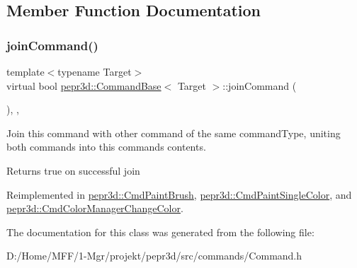 \subsection{Member Function Documentation}
\mbox{\label{classpepr3d_1_1_command_base_a9ef408154b7cb446e626e049f268abb4}} 
\subsubsection{\texorpdfstring{joinCommand()}{joinCommand()}}
{\footnotesize\ttfamily template$<$typename Target$>$ \\
virtual bool \mbox{\hyperlink{classpepr3d_1_1_command_base}{pepr3d\+::\+Command\+Base}}$<$ Target $>$\+::join\+Command (\begin{DoxyParamCaption}\item[{const \mbox{\hyperlink{classpepr3d_1_1_command_base}{Command\+Base}}$<$ Target $>$ \&}]{ }\end{DoxyParamCaption})\hspace{0.3cm}{\ttfamily [inline]}, {\ttfamily [protected]}, {\ttfamily [virtual]}}



Join this command with other command of the same command\+Type, uniting both commands into this command\textquotesingle{}s contents. 

\begin{DoxyReturn}{Returns}
true on successful join 
\end{DoxyReturn}


Reimplemented in \mbox{\hyperlink{classpepr3d_1_1_cmd_paint_brush_a05e6c87b7cd47b72150e05f2ee584ee8}{pepr3d\+::\+Cmd\+Paint\+Brush}}, \mbox{\hyperlink{classpepr3d_1_1_cmd_paint_single_color_a99945a65b5efae3151ebdbae619f3eed}{pepr3d\+::\+Cmd\+Paint\+Single\+Color}}, and \mbox{\hyperlink{classpepr3d_1_1_cmd_color_manager_change_color_a0c77133a022d16d1aa55ba477dade531}{pepr3d\+::\+Cmd\+Color\+Manager\+Change\+Color}}.



The documentation for this class was generated from the following file\+:\begin{DoxyCompactItemize}
\item 
D\+:/\+Home/\+M\+F\+F/1-\/\+Mgr/projekt/pepr3d/src/commands/Command.\+h\end{DoxyCompactItemize}
